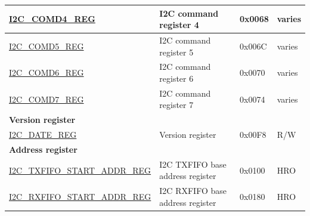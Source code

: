\begin{longtable}{ | p{6cm} | p{7cm} | p{1.3cm} | p{1cm} | }
\hyperref[regdesc:I2CCOMD4REG]{I2C\_COMD4\_REG} & I2C command register 4 & 0x0068 & varies \\ \hline
\hyperref[regdesc:I2CCOMD5REG]{I2C\_COMD5\_REG} & I2C command register 5 & 0x006C & varies \\ \hline
\hyperref[regdesc:I2CCOMD6REG]{I2C\_COMD6\_REG} & I2C command register 6 & 0x0070 & varies \\ \hline
\hyperref[regdesc:I2CCOMD7REG]{I2C\_COMD7\_REG} & I2C command register 7 & 0x0074 & varies \\ \hline
\multicolumn{4}{|l|}{\textbf{Version register}} \\ \hline
\hyperref[regdesc:I2CDATEREG]{I2C\_DATE\_REG} & Version register & 0x00F8 & R/W \\ \hline
\multicolumn{4}{|l|}{\textbf{Address register}} \\ \hline
\hyperref[regdesc:I2CTXFIFOSTARTADDRREG]{I2C\_TXFIFO\_START\_ADDR\_REG} & I2C TXFIFO base address register & 0x0100 & HRO \\ \hline
\hyperref[regdesc:I2CRXFIFOSTARTADDRREG]{I2C\_RXFIFO\_START\_ADDR\_REG} & I2C RXFIFO base address register & 0x0180 & HRO \\ \hline
\end{longtable}
